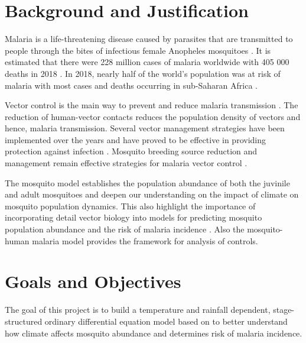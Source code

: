 \documentclass[12pt,a4paper,titlepage]{article}
\begin{document}
\section{Background and Justification}
Malaria is a life-threatening disease caused by parasites that are transmitted to people through the bites of infectious female Anopheles mosquitoes \cite{WikBlack5, beck2013temperature}. It is estimated that there were 228 million cases of malaria worldwide with 405 000 deaths in 2018 \cite{WikBlack5}. In 2018, nearly half of the world's population was at risk of malaria with most cases and deaths occurring in sub-Saharan Africa \cite{WikBlack5}.
 
Vector control is the main way to prevent and reduce malaria transmission \cite{WikBlack5}. The reduction of human-vector contacts reduces the population density of vectors and hence, malaria transmission. Several vector management strategies have been implemented over the years and have proved to be effective in providing protection against infection \cite{Ocspp2016SuccessIM}. Mosquito breeding source reduction and management remain effective strategies for malaria vector control \cite{Ocspp2016SuccessIM}.

The mosquito model establishes the population abundance of both the juvinile and adult mosquitoes and deepen our understanding on the impact of climate on mosquito population dynamics. This also highlight the importance of incorporating detail vector biology into models for predicting mosquito population abundance and the risk of malaria incidence \cite{beck2013effect, beck2017importance}. Also the mosquito-human malaria model provides the framework for analysis of controls. 

\section{Goals and Objectives}

The goal of this project is to build a temperature and rainfall dependent, stage-structured ordinary differential equation model based on \cite{abdelrazec2017mathematical, hamdan2020effect, ewing2016modelling} to better understand how climate affects mosquito abundance and determines risk of malaria incidence. 
\end{document}
